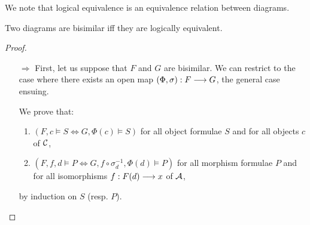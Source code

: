 We note that logical equivalence is an equivalence relation between diagrams.


\begin{theo}
Two diagrams are bisimilar iff they are logically equivalent.
\end{theo}

\begin{proof}~
\begin{itemize}
	\item[$\Rightarrow$] First, let us suppose that $F$ and $G$ are bisimilar. We can restrict to the case where there exists an open map $(\Phi,\sigma) : F \longrightarrow G$, the general case ensuing.
	
We prove that: 
\begin{enumerate}
	\item $(F,c\models S \Leftrightarrow G,\Phi(c)\models S)$ for all object formulae $S$ and for all objects $c$ of $\mathcal{C}$, 
	\item $(F,f,d\models P \Leftrightarrow G,f\circ\sigma_d^{-1},\Phi(d)\models P)$ for all morphism formulae $P$ and for all isomorphisms $f : F(d) \longrightarrow x$ of $\mathcal{A}$,
\end{enumerate} 
by induction on $S$ (resp. $P$).


\end{itemize}
\end{proof}
